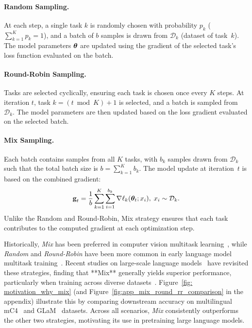 \paragraph{Random Sampling.} At each step, a single task \( k \) is randomly chosen with probability \( p_k \) (\(\sum_{k=1}^K p_k = 1\)), and a batch of \( b \) samples is drawn from \( \mathcal{D}_k \) (dataset of task~$k$). The model parameters \( \bm{\theta} \) are updated using the gradient of the selected task's loss function evaluated on the batch.

\paragraph{Round-Robin Sampling.} Tasks are selected cyclically, ensuring each task is chosen once every \( K \) steps. At iteration \( t \), task \( k = (t \bmod K) + 1 \) is selected, and a batch is sampled from \( \mathcal{D}_k \). The model parameters are then updated based on the  loss gradient evaluated on the selected batch.

\paragraph{Mix Sampling.} Each batch contains samples from all \( K \) tasks, with \( b_k \) samples drawn from \( \mathcal{D}_k \) such that the total batch size is \( b = \sum_{k=1}^K b_k \). 
The model  update at iteration~$t$ is based on the combined gradient:
\begin{equation}\label{eq: mix_framework}
\boldsymbol{\mathrm{g}}_t = \frac{1}{b} \sum_{k=1}^{K} \sum_{i=1}^{b_k} \nabla \ell_k (\bm{\theta}_t; x_i), \; x_i \sim \mathcal{D}_k.
\end{equation}
 Unlike the Random and Round-Robin, Mix strategy  ensures that each task contributes  to the computed gradient at each optimization step.

Historically, \textit{Mix} has been preferred in computer vision multitask learning~\citep{dai2016instance, misra2016cross, chen2018gradnorm, ruder2019latent, yu2020gradient, liu2024famo}, while \textit{Random} and \textit{Round-Robin} have been more common in early language model multitask training~\citep{liu2015representation, luong2015multi, liu2019multi}.  
Recent studies on large-scale language models~\citep{devlin2018bert, raffel2020exploring, brown2020language, team2023gemini} have revisited these strategies, finding that **Mix** generally yields superior performance, particularly when training across diverse datasets~\citep{du2022glam, chowdhery2023palm, xie2024doremi, raffel2020exploring, gao2020pile, wang2019superglue}. Figure~\ref{fig: motivation_why_mix}  (and Figure~\ref{fig:app_mix_round_rr_comparison} in the appendix) illustrate this by comparing downstream accuracy on multilingual mC4~\citep{xue2020mt5} and GLaM~\citep{du2022glam} datasets. Across all scenarios, \textit{Mix} consistently outperforms the other two strategies, motivating its use in pretraining large language models.


